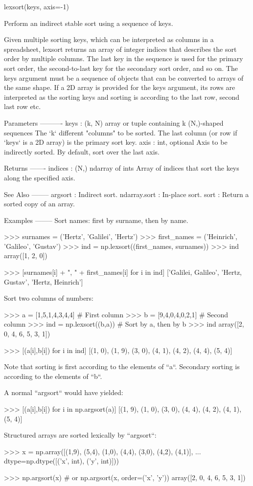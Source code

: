 \begin{DoxyVerb}lexsort(keys, axis=-1)

Perform an indirect stable sort using a sequence of keys.

Given multiple sorting keys, which can be interpreted as columns in a
spreadsheet, lexsort returns an array of integer indices that describes
the sort order by multiple columns. The last key in the sequence is used
for the primary sort order, the second-to-last key for the secondary sort
order, and so on. The keys argument must be a sequence of objects that
can be converted to arrays of the same shape. If a 2D array is provided
for the keys argument, its rows are interpreted as the sorting keys and
sorting is according to the last row, second last row etc.

Parameters
----------
keys : (k, N) array or tuple containing k (N,)-shaped sequences
    The `k` different "columns" to be sorted.  The last column (or row if
    `keys` is a 2D array) is the primary sort key.
axis : int, optional
    Axis to be indirectly sorted.  By default, sort over the last axis.

Returns
-------
indices : (N,) ndarray of ints
    Array of indices that sort the keys along the specified axis.

See Also
--------
argsort : Indirect sort.
ndarray.sort : In-place sort.
sort : Return a sorted copy of an array.

Examples
--------
Sort names: first by surname, then by name.

>>> surnames =    ('Hertz',    'Galilei', 'Hertz')
>>> first_names = ('Heinrich', 'Galileo', 'Gustav')
>>> ind = np.lexsort((first_names, surnames))
>>> ind
array([1, 2, 0])

>>> [surnames[i] + ", " + first_names[i] for i in ind]
['Galilei, Galileo', 'Hertz, Gustav', 'Hertz, Heinrich']

Sort two columns of numbers:

>>> a = [1,5,1,4,3,4,4] # First column
>>> b = [9,4,0,4,0,2,1] # Second column
>>> ind = np.lexsort((b,a)) # Sort by a, then by b
>>> ind
array([2, 0, 4, 6, 5, 3, 1])

>>> [(a[i],b[i]) for i in ind]
[(1, 0), (1, 9), (3, 0), (4, 1), (4, 2), (4, 4), (5, 4)]

Note that sorting is first according to the elements of ``a``.
Secondary sorting is according to the elements of ``b``.

A normal ``argsort`` would have yielded:

>>> [(a[i],b[i]) for i in np.argsort(a)]
[(1, 9), (1, 0), (3, 0), (4, 4), (4, 2), (4, 1), (5, 4)]

Structured arrays are sorted lexically by ``argsort``:

>>> x = np.array([(1,9), (5,4), (1,0), (4,4), (3,0), (4,2), (4,1)],
...              dtype=np.dtype([('x', int), ('y', int)]))

>>> np.argsort(x) # or np.argsort(x, order=('x', 'y'))
array([2, 0, 4, 6, 5, 3, 1])\end{DoxyVerb}
